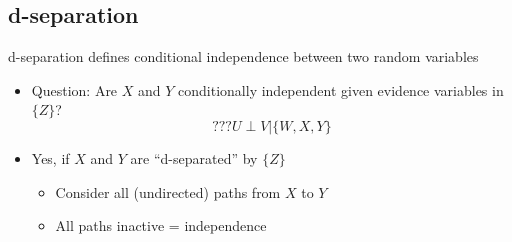 \documentclass[10pt]{article}
\begin{document}
\subsection*{d-separation}
d-separation defines conditional independence between two random variables
\begin{itemize}
	\item Question: Are $X$ and $Y$ conditionally independent given evidence variables in $\{Z\}$?
	\[??? U \perp V | \{W, X, Y\}\]
    \item Yes, if $X$ and $Y$ are ``d-separated'' by $\{Z\}$
    \begin{itemize}
	    \item Consider all (undirected) paths from $X$ to $Y$
	    \item All paths inactive = independence
    \end{itemize}
\end{itemize}
\begin{center}
\end{center}
\end{document}
